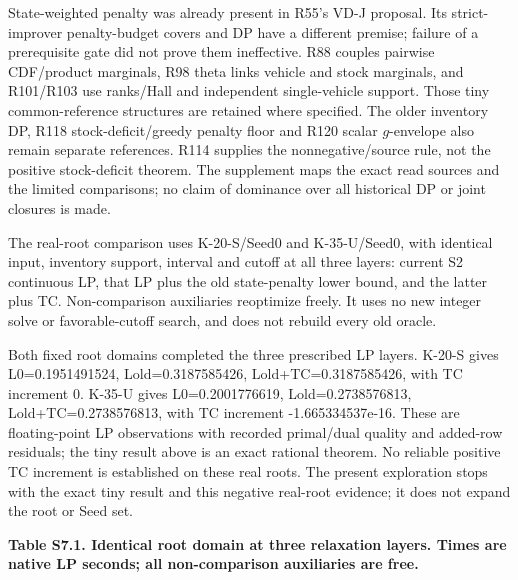 \documentclass[
  american,
  11pt,
]{article}
\begin{document}
State-weighted penalty was already present in R55's VD-J proposal. Its
strict-improver penalty-budget covers and DP have a different premise;
failure of a prerequisite gate did not prove them ineffective. R88
couples pairwise CDF/product marginals, R98 theta links vehicle and
stock marginals, and R101/R103 use ranks/Hall and independent
single-vehicle support. Those tiny common-reference structures are
retained where specified. The older inventory DP, R118
stock-deficit/greedy penalty floor and R120 scalar \(g\)-envelope also
remain separate references. R114 supplies the nonnegative/source rule,
not the positive stock-deficit theorem. The supplement maps the exact
read sources and the limited comparisons; no claim of dominance over all
historical DP or joint closures is made.

The real-root comparison uses K-20-S/Seed0 and K-35-U/Seed0, with
identical input, inventory support, interval and cutoff at all three
layers: current S2 continuous LP, that LP plus the old state-penalty
lower bound, and the latter plus TC. Non-comparison auxiliaries
reoptimize freely. It uses no new integer solve or favorable-cutoff
search, and does not rebuild every old oracle.

Both fixed root domains completed the three prescribed LP layers. K-20-S
gives L0=0.1951491524, Lold=0.3187585426, Lold+TC=0.3187585426, with TC
increment 0. K-35-U gives L0=0.2001776619, Lold=0.2738576813,
Lold+TC=0.2738576813, with TC increment -1.665334537e-16. These are
floating-point LP observations with recorded primal/dual quality and
added-row residuals; the tiny result above is an exact rational theorem.
No reliable positive TC increment is established on these real roots.
The present exploration stops with the exact tiny result and this
negative real-root evidence; it does not expand the root or Seed set.

\Needspace{138pt}


\textbf{Table S7.1. Identical root domain at three relaxation layers.
Times are native LP seconds; all non-comparison auxiliaries are free.}
\end{document}
